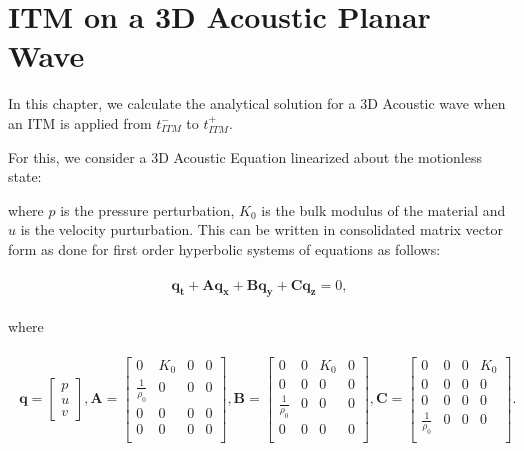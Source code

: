 \section{\ac{ITM} on a 3D Acoustic Planar Wave}\label{section:3DITMAcoustic}
In this chapter, we calculate the analytical solution for a 3D Acoustic wave when an \ac{ITM} is applied from $t_{ITM}^-$ to $t_{ITM}^+$.

For this, we consider a 3D Acoustic Equation linearized about the motionless state:

where $p$ is the pressure perturbation, $K_0$ is the bulk modulus of the material and $u$ is the velocity purturbation. 
This can be written in consolidated matrix vector form as done for first order hyperbolic systems of equations as follows:

\begin{align}
    \begin{split}
        \mathbf{q_t} + \mathbf{Aq_x} + \mathbf{Bq_y} + \mathbf{Cq_z} = 0,
    \end{split}
    \label{eq:3Dacoustic}
\end{align}

where 

\begin{align}
    \begin{split}
        \mathbf{q} = \begin{bmatrix}
            p \\
            u \\
            v
        \end{bmatrix},
        \mathbf{A} = \begin{bmatrix}
            0 & K_0 & 0 & 0 \\
            \frac{1}{\rho_0} & 0 & 0 & 0 \\
            0 & 0 & 0 & 0 \\
            0 & 0 & 0 & 0 \\
        \end{bmatrix},
        \mathbf{B} = \begin{bmatrix}
            0 & 0 & K_0 & 0 \\
            0 & 0 & 0 & 0 \\
            \frac{1}{\rho_0} & 0 & 0 & 0 \\
            0 & 0 & 0 & 0 \\
        \end{bmatrix},
        \mathbf{C} = \begin{bmatrix}
            0 & 0 & 0 & K_0 \\
            0 & 0 & 0 & 0 \\
            0 & 0 & 0 & 0 \\
            \frac{1}{\rho_0} & 0 & 0 & 0 \\
        \end{bmatrix}.
    \end{split}
\end{align}

